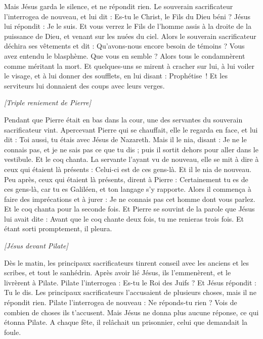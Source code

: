 \begin{multicols}{2}
Mais Jésus garda le silence, et ne répondit rien. Le souverain sacrificateur l'interrogea de nouveau, et lui dit : Es-tu le Christ, le Fils du Dieu béni ?
Jésus lui répondit : Je le suis. Et vous verrez le Fils de l'homme assis à la droite de la puissance de Dieu, et venant sur les nuées du ciel.
Alors le souverain sacrificateur déchira ses vêtements et dit : Qu'avons-nous encore besoin de témoins ?
Vous avez entendu le blasphème. Que vous en semble ? Alors tous le condamnèrent comme méritant la mort.
Et quelques-uns se mirent à cracher sur lui, à lui voiler le visage, et à lui donner des soufflets, en lui disant : Prophétise ! Et les serviteurs lui donnaient des coups avec leurs verges.
\begin{center}
\textit{[Triple reniement de Pierre]}
\end{center}
\PPE{}
Pendant que Pierre était en bas dans la cour, une des servantes du souverain sacrificateur vint.
Apercevant Pierre qui se chauffait, elle le regarda en face, et lui dit : Toi aussi, tu étais avec Jésus de Nazareth.
Mais il le nia, disant : Je ne le connais pas, et je ne sais pas ce que tu dis ; puis il sortit dehors pour aller dans le vestibule. Et le coq chanta.
La servante l'ayant vu de nouveau, elle se mit à dire à ceux qui étaient là présents : Celui-ci est de ces gens-là. Et il le nia de nouveau.
Peu après, ceux qui étaient là présents, dirent à Pierre : Certainement tu es de ces gens-là, car tu es Galiléen, et ton langage s'y rapporte.
Alors il commença à faire des imprécations et à jurer : Je ne connais pas cet homme dont vous parlez.
Et le coq chanta pour la seconde fois. Et Pierre se souvint de la parole que Jésus lui avait dite : Avant que le coq chante deux fois, tu me renieras trois fois. Et étant sorti promptement, il pleura.
\begin{center}
\textit{[Jésus devant Pilate]}
\end{center}
\VerseOne{}Dès le matin, les principaux sacrificateurs tinrent conseil avec les anciens et les scribes, et tout le sanhédrin. Après avoir lié Jésus, ils l'emmenèrent, et le livrèrent à Pilate.
Pilate l'interrogea : Es-tu le Roi des Juifs ? Et Jésus répondit : Tu le dis.
Les principaux sacrificateurs l'accusaient de plusieurs choses, mais il ne répondit rien.
Pilate l'interrogea de nouveau : Ne réponds-tu rien ? Vois de combien de choses ils t’accusent.
Mais Jésus ne donna plus aucune réponse, ce qui étonna Pilate.
A chaque fête, il relâchait un prisonnier, celui que demandait la foule.

\end{multicols}
